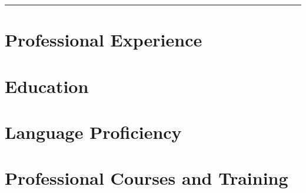 \documentclass[letter,10pt]{article}
\begin{document}


{\color{highlight}\vspace{-0.5em}\hrule\vspace{0.5em}}


\section{Professional Experience}


\section{Education}



\section{Language Proficiency}


\section{Professional Courses and Training}


% 
\end{document}
